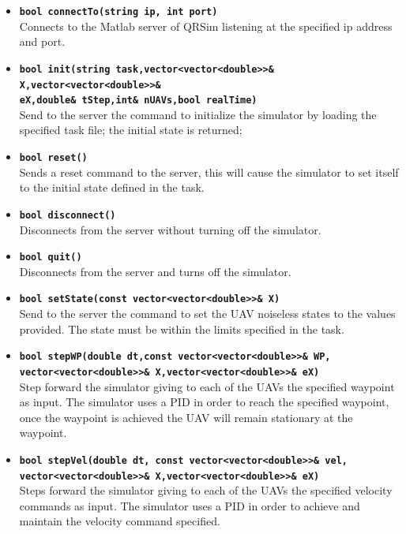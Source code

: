 \documentclass[a4paper,11pt]{report}
\begin{document}
\begin{itemize}

\item \textbf{\texttt{bool connectTo(string ip, int port)}}\\
  Connects to the Matlab server of QRSim listening at the specified ip address and port. 
  
\item \textbf{\texttt{bool init(string task,vector<vector<double>>\& X,vector<vector<double>>\&\\ \hspace*{55pt} eX,double\& tStep,int\& nUAVs,bool realTime)}}\\
Send to the server the command to initialize the simulator by loading the specified task file; the initial state is returned;

\item \textbf{\texttt{bool reset()}}\\
Sends a reset command to the server, this will cause the simulator to set itself to the initial state defined in the task.

\item \textbf{\texttt{bool disconnect()}}\\
Disconnects from the server without turning off the simulator.

\item \textbf{\texttt{bool quit()}}\\
Disconnects from the server and turns off the simulator.

\item \textbf{\texttt{bool setState(const vector<vector<double>>\& X)}}\\
Send to the server the command to set the UAV noiseless states to the values provided. The state must be within the limits specified in the task.

\item \textbf{\texttt{bool stepWP(double dt,const vector<vector<double>>\& WP,\\ \hspace*{68pt} vector<vector<double>>\& X,vector<vector<double>>\& eX)}}\\
Step forward the simulator giving to each of the UAVs the specified waypoint as input.
The simulator uses a PID in order to reach the specified waypoint, once the waypoint is achieved the UAV will remain stationary at the waypoint.

\item \textbf{\texttt{bool stepVel(double dt, const vector<vector<double>>\& vel,\\ \hspace*{72pt} vector<vector<double>>\& X,vector<vector<double>>\& eX)}}\\
Steps forward the simulator giving to each of the UAVs the specified velocity commands as input.
The simulator uses a PID in order to achieve and maintain the velocity command specified.


\end{itemize}
\end{document}
